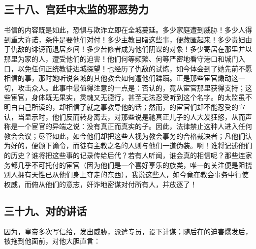 
\subsection{三十八、宫廷中太监的邪恶势力}

书信的内容既是如此，恐惧与欺诈立即在全城蔓延。多少家庭遭到威胁！多少人得到重大许诺，条件是要他们对付！多少主教目睹这些事，便藏匿起来！多少贵妇由于仇敌的诽谤而退居乡间！多少苦修者成为他们阴谋的对象！多少寄居在那里并以那里为家的人，遭受他们的迫害！他们何等频繁、何等严密地看守港口和城门入口，以免任何正统教徒进城探望！也经历了仇敌的试炼，如今体会到了她先前不愿相信的事，那时她听说各城的其他教会如何遭他们蹂躏。正是那些宦官煽动这一切，攻击众人。此事中最值得注意的一点是：否认的，竟从宦官那里获得支持；这些宦官，身体既无果实，灵魂又无德行，甚至无法忍受听到这个名字。的太监虽不明白自己所读的，却相信了就之事教导他的话；然而，的宦官们却不能忍受的宣认，当显示时，他们反而转身离去，对那些说是祂真正儿子的人大发狂怒，从而声称是一个宦官的异端之说：没有真正而真实的子。因此，法律禁止这种人进入任何教会会议；尽管如此，如今他们却把这些人视为教会事务的合格裁决者；凡他们认为好的，便颁下谕令，而徒有主教之名的人则与他们一道伪装。啊！谁将记述他们的历史？谁将把这些事的记录传给后代？若有人听闻，谁会真的相信呢？那些连家务都几乎不可托付的宦官（因为他们是一个喜好享乐的族类，唯一的关注便是阻挠别人拥有天性已从他们身上夺走的东西），我说这些人，如今竟在教会事务中行使权威，而俯从他们的意志，奸诈地密谋对付所有人，并放逐了！\par


\subsection{三十九、对的讲话}

因为，皇帝多次写信给，发出威胁，派遣专员，设下计谋；随后在的迫害爆发后，被拖到他面前，对他大胆直言：\par

